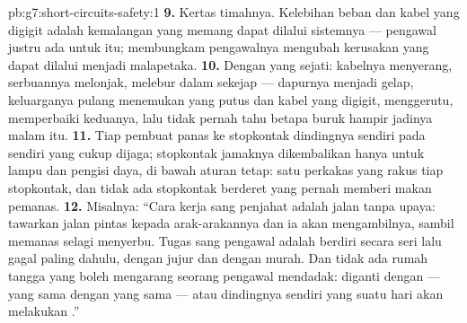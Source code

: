 \begin{solution}{pb:g7:short-circuits-safety:1}
\textbf{9.} Kertas timahnya. Kelebihan beban dan kabel yang digigit
adalah kemalangan yang memang dapat dilalui sistemnya --- pengawal
justru ada untuk itu; membungkam pengawalnya mengubah kerusakan yang
dapat dilalui menjadi malapetaka.
\textbf{10.} Dengan  yang sejati:  kabelnya menyerang,
serbuannya melonjak,  melebur dalam sekejap --- dapurnya
menjadi gelap, keluarganya pulang menemukan  yang putus dan
kabel yang digigit, menggerutu, memperbaiki keduanya, lalu tidak
pernah tahu betapa buruk hampir jadinya malam itu.
\textbf{11.} Tiap pembuat panas ke stopkontak dindingnya sendiri pada
 sendiri yang cukup dijaga; stopkontak jamaknya dikembalikan
hanya untuk lampu dan pengisi daya, di bawah aturan tetap: satu
perkakas yang rakus tiap stopkontak, dan tidak ada stopkontak berderet
yang pernah memberi makan pemanas.
\textbf{12.} Misalnya: ``Cara kerja sang penjahat adalah jalan tanpa
upaya: tawarkan jalan pintas kepada arak-arakannya dan ia akan
mengambilnya, sambil memanas selagi menyerbu. Tugas sang pengawal
adalah berdiri secara seri lalu gagal paling dahulu, dengan jujur dan
dengan murah. Dan tidak ada rumah tangga yang boleh mengarang seorang
pengawal mendadak:  diganti dengan  --- yang sama dengan
yang sama --- atau dindingnya sendiri yang suatu hari akan melakukan
.''
\end{solution}
